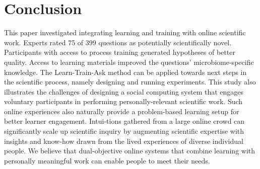 \section{Conclusion}
This paper investigated integrating learning and training with online scientific work. Experts rated 75 of 399 questions as potentially scientifically novel. Participants with access to process training generated hypotheses of better quality. Access to learning materials improved the questions’ microbiome-specific knowledge.  The Learn-Train-Ask method can be applied towards next steps in the scientific process, namely designing and running experiments. This study also illustrates the challenges of designing a social computing system that engages voluntary participants in performing personally-relevant scientific work. Such online experiences also naturally provide a problem-based learning setup for better learner engagement. Intui-tions gathered from a large online crowd can significantly scale up scientific inquiry by augmenting scientific expertise with insights and know-how drawn from the lived experiences of diverse individual people. We believe that dual-objective online systems that combine learning with personally meaningful work can enable people to meet their needs.


